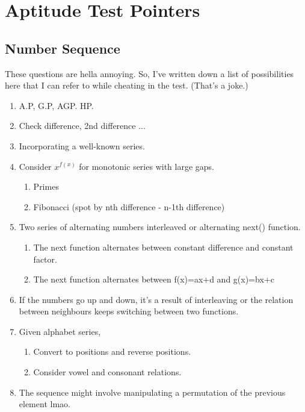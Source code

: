 \section{Aptitude Test Pointers}
\subsection{Number Sequence}
These questions are hella annoying. So, I've written down a list of possibilities 
here that I can refer to while cheating in the test. (That's a joke.)
\begin{enumerate}
    \item A.P, G.P, AGP. HP.
    \item Check difference, 2nd difference ...
    \item Incorporating a well-known series.
    \item Consider $x^{f(x)}$ for monotonic series with large gaps.
    \begin{enumerate}
        \item Primes
        \item Fibonacci (spot by nth difference - n-1th difference)
    \end{enumerate}
    \item Two series of alternating numbers interleaved or alternating next() function.
    \begin{enumerate}
        \item The next function alternates between constant difference and constant factor.
        \item The next function alternates between f(x)=ax+d and g(x)=bx+c
    \end{enumerate}
    \item If the numbers go up and down, it's a result of interleaving or the relation between neighbours keeps switching between two functions.
    \item Given alphabet series,
    \begin{enumerate}
        \item Convert to positions and reverse positions.
        \item Consider vowel and consonant relations.
    \end{enumerate}
    \item The sequence might involve manipulating a permutation of the previous element lmao.
\end{enumerate}
